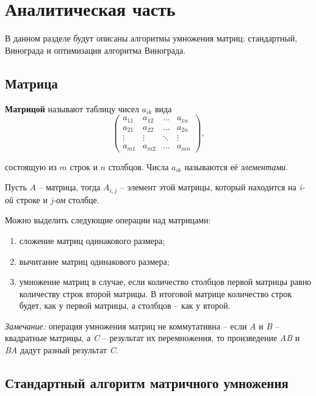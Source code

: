 \chapter{Аналитическая часть}

В данном разделе будут описаны алгоритмы умножения матриц: стандартный, Винограда и оптимизация алгоритма Винограда.

\section{Матрица}
\textbf{Матрицой} \cite{virt} называют таблицу чисел $a_{ik}$ вида
\begin{equation}
	\begin{pmatrix}
		a_{11} & a_{12} & \ldots & a_{1n}\\
		a_{21} & a_{22} & \ldots & a_{2n}\\
		\vdots & \vdots & \ddots & \vdots\\
		a_{m1} & a_{m2} & \ldots & a_{mn}
	\end{pmatrix},
\end{equation}

состоящую из $m$ строк и $n$ столбцов. Числа $a_{ik}$ называются её \textit{элементами}.

Пусть $A$ -- матрица, тогда $A_{i,j}$ -- элемент этой матрицы, который находится на \textit{i-ой} строке и \textit{j-ом} столбце.

Можно выделить следующие операции над матрицами:
\begin{enumerate}
	\item сложение матриц одинакового размера;
	\item вычитание матриц одинакового размера;
	\item умножение матриц в случае, если количество столбцов первой матрицы равно количеству строк второй матрицы. В итоговой матрице количество строк будет, как у первой матрицы, а столбцов -- как у второй. \newline
\end{enumerate}

\textit{Замечание:} операция умножения матриц не коммутативна -- если \textit{A} и \textit{B} -- квадратные матрицы, а \textit{C} -- результат их перемножения, то произведение \textit{AB} и \textit{BA} дадут разный результат \textit{C}.

\section{Стандартный алгоритм матричного умножения}

